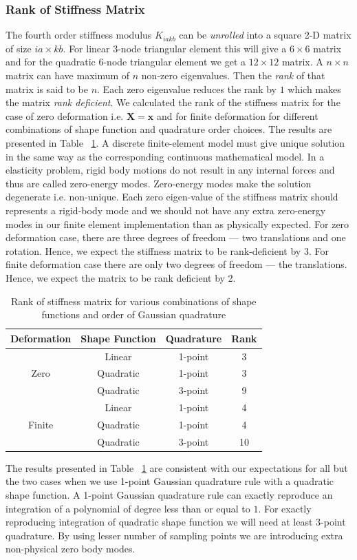 \documentclass[../main.tex]{subfiles}
\begin{document}
\subsubsection{Rank of Stiffness Matrix}
The fourth order stiffness modulus $K_{iakb}$ can be \textit{unrolled}
into a square 2-D matrix of size $ia\times kb$. For linear 3-node
triangular element this will give a $6\times6$ matrix and for the
quadratic 6-node triangular element we get a $12\times12$ matrix. A
$n\times n$ matrix can have maximum of $n$ non-zero eigenvalues. Then
the \textit{rank} of that matrix is said to be $n$. Each zero
eigenvalue reduces the rank by $1$ which makes the matrix \textit{rank
  deficient}. We calculated the rank of the stiffness matrix for the
case of zero deformation i.e. $\mathbf{X}=\mathbf{x}$ and for finite
deformation for different combinations of shape function and
quadrature order choices. The results are presented in Table
~\ref{tab:rank}. A discrete finite-element model must give unique
solution in the same way as the corresponding continuous mathematical
model. In a elasticity problem, rigid body motions do not result in
any internal forces and thus are called zero-energy modes. Zero-energy
modes make the solution degenerate i.e. non-unique. Each zero
eigen-value of the stiffness matrix should represents a rigid-body
mode and we should not have any extra zero-energy modes in our finite
element implementation than as physically expected. For zero
deformation case, there are three degrees of freedom --- two
translations and one rotation. Hence, we expect the stiffness matrix
to be rank-deficient by 3. For finite deformation case there are only
two degrees of freedom --- the translations. Hence, we expect the
matrix to be rank deficient by 2.
\begin{table}
  \centering
  \caption{Rank of stiffness matrix for various combinations of shape functions and order of Gaussian quadrature}
  \label{tab:rank}
  \begin{tabular}{|c|c|c|c|}
    \hline
    Deformation & Shape Function & Quadrature & Rank \\
    \hline
    \multirow{3}{*}{Zero} & Linear & 1-point & 3 \\
    \cline{2-4}
                & Quadratic & 1-point & 3 \\
    \cline{2-4}
                & Quadratic & 3-point & 9 \\
    \hline
    \multirow{3}{*}{Finite} & Linear & 1-point & 4 \\
    \cline{2-4}
                & Quadratic & 1-point & 4 \\
    \cline{2-4}
                & Quadratic & 3-point & 10 \\
    \hline
  \end{tabular}
\end{table}
The results presented in Table ~\ref{tab:rank} are consistent with our
expectations for all but the two cases when we use 1-point Gaussian
quadrature rule with a quadratic shape function. A 1-point Gaussian
quadrature rule can exactly reproduce an integration of a polynomial
of degree less than or equal to $1$. For exactly reproducing
integration of quadratic shape function we will need at least 3-point
quadrature. By using lesser number of sampling points we are
introducing extra non-physical zero body modes.
\end{document}
